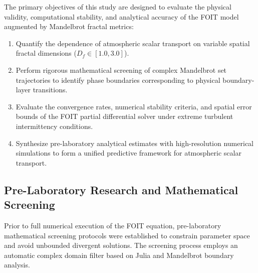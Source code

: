 \documentclass[11pt,a4paper]{article}
\begin{document}
The primary objectives of this study are designed to evaluate the physical validity, computational stability, and analytical accuracy of the FOIT model augmented by Mandelbrot fractal metrics:

\begin{enumerate}
    \item Quantify the dependence of atmospheric scalar transport on variable spatial fractal dimensions ($D_f \in [1.0, 3.0]$).
    \item Perform rigorous mathematical screening of complex Mandelbrot set trajectories to identify phase boundaries corresponding to physical boundary-layer transitions.
    \item Evaluate the convergence rates, numerical stability criteria, and spatial error bounds of the FOIT partial differential solver under extreme turbulent intermittency conditions.
    \item Synthesize pre-laboratory analytical estimates with high-resolution numerical simulations to form a unified predictive framework for atmospheric scalar transport.
\end{enumerate}

\subsection{Pre-Laboratory Research and Mathematical Screening}

Prior to full numerical execution of the FOIT equation, pre-laboratory mathematical screening protocols were established to constrain parameter space and avoid unbounded divergent solutions. The screening process employs an automatic complex domain filter based on Julia and Mandelbrot boundary analysis.
\end{document}
